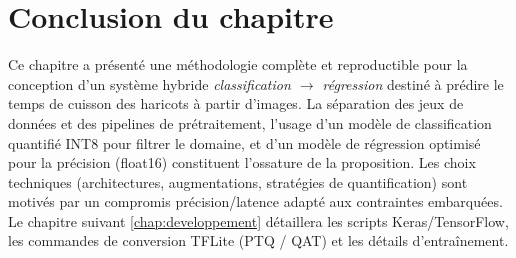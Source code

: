 \section{Conclusion du chapitre}

Ce chapitre a présenté une méthodologie complète et reproductible pour la conception d'un système hybride \emph{classification $\rightarrow$ régression} destiné à prédire le temps de cuisson des haricots à partir d'images. La séparation des jeux de données et des pipelines de prétraitement, l'usage d'un modèle de classification quantifié INT8 pour filtrer le domaine, et d'un modèle de régression optimisé pour la précision (float16) constituent l'ossature de la proposition. Les choix techniques (architectures, augmentations, stratégies de quantification) sont motivés par un compromis précision/latence adapté aux contraintes embarquées. Le chapitre suivant \ref{chap:developpement} détaillera les scripts Keras/TensorFlow, les commandes de conversion TFLite (PTQ / QAT) et les détails d'entraînement.

